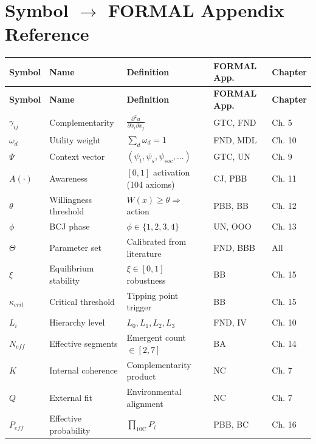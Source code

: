 \section{Symbol $\rightarrow$ FORMAL Appendix Reference}
\label{sec:fm-symbols}

\begin{tcolorbox}[colback=yellow!3!white, colframe=yellow!60!black,
    title=\textbf{Key Mathematical Symbols and Their Authoritative Sources}]

\small
\begin{longtable}{|l|l|l|l|l|}
\hline
\textbf{Symbol} & \textbf{Name} & \textbf{Definition} & \textbf{FORMAL App.} & \textbf{Chapter} \\
\hline
\hline
\endfirsthead
\hline
\textbf{Symbol} & \textbf{Name} & \textbf{Definition} & \textbf{FORMAL App.} & \textbf{Chapter} \\
\hline
\endhead
$\gamma_{ij}$ & Complementarity & $\frac{\partial^2 u}{\partial x_i \partial x_j}$ & GTC, FND & Ch. 5 \\
$\omega_d$ & Utility weight & $\sum_d \omega_d = 1$ & FND, MDL & Ch. 10 \\
$\Psi$ & Context vector & $(\psi_t, \psi_s, \psi_{soc}, \ldots)$ & GTC, UN & Ch. 9 \\
$A(\cdot)$ & Awareness & $[0,1]$ activation (104 axioms) & CJ, PBB & Ch. 11 \\
$\theta$ & Willingness threshold & $W(x) \geq \theta \Rightarrow$ action & PBB, BB & Ch. 12 \\
$\phi$ & BCJ phase & $\phi \in \{1,2,3,4\}$ & UN, OOO & Ch. 13 \\
$\Theta$ & Parameter set & Calibrated from literature & FND, BBB & All \\
$\xi$ & Equilibrium stability & $\xi \in [0,1]$ robustness & BB & Ch. 15 \\
$\kappa_{crit}$ & Critical threshold & Tipping point trigger & BB & Ch. 15 \\
$L_i$ & Hierarchy level & $L_0, L_1, L_2, L_3$ & FND, IV & Ch. 10 \\
$N_{eff}$ & Effective segments & Emergent count $\in [2,7]$ & BA & Ch. 14 \\
$K$ & Internal coherence & Complementarity product & NC & Ch. 7 \\
$Q$ & External fit & Environmental alignment & NC & Ch. 7 \\
$P_{eff}$ & Effective probability & $\prod_{\text{10C}} P_i$ & PBB, BC & Ch. 16 \\
\hline
\end{longtable}

\end{tcolorbox}

